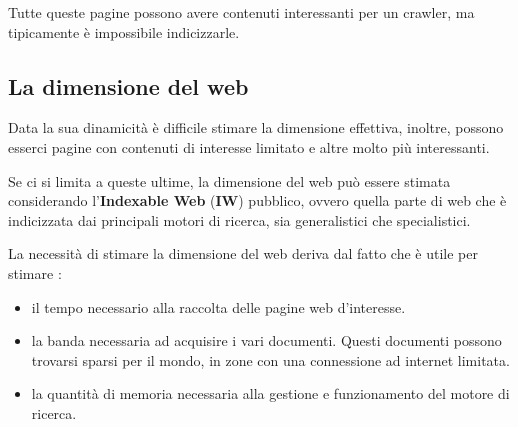 Tutte queste pagine possono avere contenuti interessanti per un crawler, ma tipicamente è impossibile indicizzarle.

\subsection{La dimensione del web}

Data la sua dinamicità è difficile stimare la dimensione effettiva, inoltre, possono esserci pagine con contenuti di interesse limitato e altre molto più interessanti.

Se ci si limita a queste ultime, la dimensione del web può essere stimata considerando l'\textbf{Indexable Web} (\textbf{IW}) pubblico, ovvero quella parte di web che è indicizzata dai principali motori di ricerca, sia generalistici che specialistici.

La necessità di stimare la dimensione del web deriva dal fatto che è utile per stimare :

\begin{itemize}
	\item il tempo necessario alla raccolta delle pagine web d'interesse.
	\item la banda necessaria ad acquisire i vari documenti. Questi documenti possono trovarsi sparsi per il mondo, in zone con una connessione ad internet limitata.
	\item la quantità di memoria necessaria alla gestione e funzionamento del motore di ricerca.
\end{itemize}





















